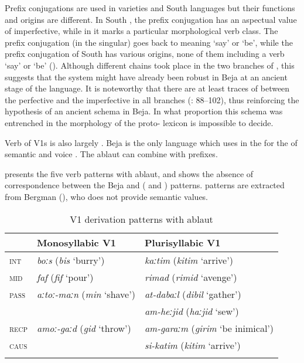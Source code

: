 \documentclass[output=paper]{langsci/langscibook}
\begin{document}
Prefix conjugations are used in  varieties and South  languages but their functions and origins are different. In South , the prefix conjugation has an aspectual value of imperfective, while in  it marks a particular morphological verb class. The  prefix conjugation (in the singular) goes back to  meaning ‘say’ or ‘be’, while the prefix conjugation of South  has various origins, none of them including a verb ‘say’ or ‘be’ (\citealt{Cohen1984}). Although different  chains took place in the two branches of , this suggests that the  system might have already been robust in Beja at an ancient stage of the language. It is noteworthy that there are at least traces of  between the perfective and the imperfective in all  branches (\citealt{Cohen1984}: 88--102), thus reinforcing the hypothesis of an ancient  schema in Beja. In what proportion this schema was entrenched in the morphology of the proto- lexicon is impossible to decide.

Verb  of V1s is also largely . Beja is the only  language which uses  in the  for the  of seman\-tic and voice . The ablaut can combine with prefixes. 

 presents the five verb  patterns with ablaut, and  shows the absence of correspondence between the Beja and  ( and ) patterns.  patterns are extracted from Bergman (\citeyear[32--34]{Bergman2002}), who does not provide semantic values.

\begin{table}
\begin{tabular}{lll}\lsptoprule 
& Monosyllabic V1 &  Plurisyllabic V1\\\midrule
\textsc{int} & \textit{boːs} (\textit{bis} ‘burry’) & \textit{kaːtim} (\textit{kitim} ‘arrive’)\\
\textsc{mid} & \textit{faf} (\textit{fif} ‘pour’) & \textit{rimad} (\textit{rimid} ‘avenge’)\\
\textsc{pass} & \textit{aːtoː-maːn} (\textit{min} ‘shave’) & \textit{at-dabaːl} (\textit{dibil} ‘gather’)\\
&  & \textit{am-heːjid} (\textit{haːjid} ‘sew’)\\
\textsc{recp} & \textit{amoː-gaːd} (\textit{gid} ‘throw’) & \textit{am-garaːm} (\textit{girim} ‘be inimical’)\\
\textsc{caus} &  & \textit{si-katim} (\textit{kitim} ‘arrive’)\\
\lspbottomrule
\end{tabular} 
\caption{V1 derivation patterns with ablaut}
\label{tab:V1}
\end{table}
\end{document}
